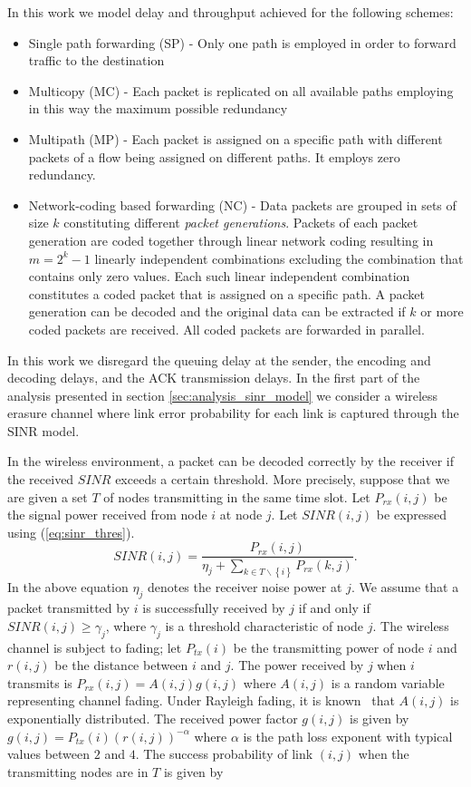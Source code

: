 \documentclass[journal, onecolumn, 12pt]{IEEEtran}
\begin{document}
In this work we model delay and throughput achieved for the following schemes:
\begin{itemize}
\item Single path forwarding (SP) - Only one path is employed in order to forward traffic to the destination
\item Multicopy (MC) - Each packet is replicated on all available
paths employing in this way the maximum possible redundancy
\item Multipath (MP) - Each packet is assigned on a specific path with different packets of a flow being assigned on different paths. It employs zero redundancy.
\item Network-coding based forwarding (NC) - Data packets are grouped in sets of size $k$ constituting different \textit{packet generations}.
Packets of each packet generation are coded together through linear network coding resulting in $m={2}^{k}-1$ linearly independent combinations excluding the combination that contains only zero values.
Each such linear independent combination constitutes a coded packet that is assigned on a specific path.
A packet generation can be decoded and the original data can be extracted if $k$ or more coded packets are received.
All coded packets are forwarded in parallel.
\end{itemize}

In this work we disregard the queuing delay at the sender, the encoding and decoding delays, and the ACK transmission delays.
In the first part of the analysis presented in section \ref{sec:analysis_sinr_model} we consider a wireless erasure channel where link error probability for each link is captured through the SINR model.

In the wireless environment, a packet can be decoded correctly by the receiver if the received $SINR$ exceeds a certain threshold.
More precisely, suppose that we are given a set $T$ of nodes transmitting in the same time slot.
Let  $P_{rx}(i,j)$ be the signal power received from node $i$ at node $j$.
Let $SINR(i,j)$ be expressed using (\ref{eq:sinr_thres}).
\begin{equation}
\label{eq:sinr_thres}
SINR(i,j)=\frac{P_{rx}(i,j)}{\eta_{j}+\sum_{k\in T\backslash\left\{i\right\}} {P_{rx}(k,j)}}.
\end{equation}
In the above equation $\eta_{j}$ denotes the receiver noise power at $j$. We assume that a packet transmitted by $i$ is successfully received by $j$
if and only if $SINR(i,j)\geq \gamma_{j}$, where $\gamma_{j}$ is a threshold characteristic of node $j$. The wireless channel is subject to fading;
let $P_{tx}(i)$ be the transmitting power of node $i$ and $r(i,j)$ be the distance between $i$ and $j$. The power received by $j$ when $i$
transmits is $P_{rx}(i,j)=A(i,j)g(i,j)$ where $A(i,j)$ is a random variable representing channel fading. Under Rayleigh fading, it is
known~\cite{b:Tse} that $A(i,j)$ is exponentially distributed. The received power factor $g(i,j)$ is given by $g(i,j)=P_{tx}(i)(r(i,j))^{-\alpha}$
where $\alpha$ is the path loss exponent with typical values between $2$ and $4$. The success probability of link $(i,j)$ when the transmitting nodes
are in $T$ is given by
\end{document}
